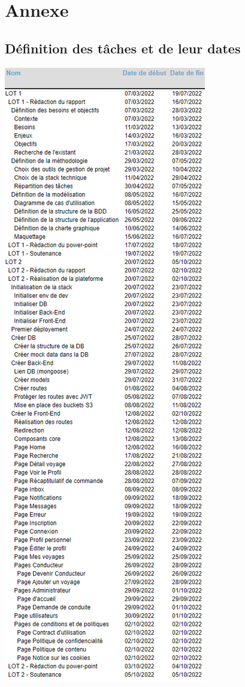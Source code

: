 \appendix
\chapter*{Annexe}
\renewcommand{\thesection}{A.\arabic{section}}


\section{Définition des tâches et de leur dates}
\label{Définition des tâches et de leur dates}
\begin{center}
\includegraphics[scale=0.5]{medias/taches.png}
\end{center}

